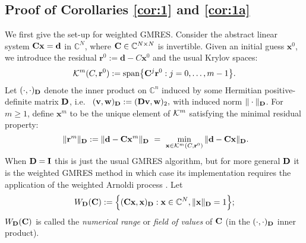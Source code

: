 \documentclass[10pt]{article}%
\newtheorem{remark}[theorem]{Remark}
\numberwithin{equation}{section}
\newcommand{\beq}{\begin{equation}}
\newcommand{\eeq}{\end{equation}}
\newcommand{\beqs}{\begin{equation*}}
\newcommand{\eeqs}{\end{equation*}}
\newcommand{\bre}{\begin{remark}}
\newcommand{\ere}{\end{remark}}
\newcommand{\cK}{{\cal K}}
\newcommand{\bx}{\mathbf{x}}
\newcommand{\br}{\mathbf{r}}
\newcommand{\bv}{\mathbf{v}}
\newcommand{\bw}{\mathbf{w}}
\newcommand{\bd}{\mathbf{d}}
\newcommand{\C}{\mathbb{C}}
\newcommand{\Com}{\mathbb{C}}
\newcommand{\HoDkk}{{H^1_{k}(\domain_R)}}
\newcommand*{\N}[1]{\left\|#1\right\|}
\newcommand{\domain}{\Omega}
\newcommand{\matrixI}{{\bf I}}
\newcommand{\matrixC}{{\bf C}}
\newcommand{\matrixD}{{\bf D}}
\newcommand{\matrixS}{{\bf S}}
\newcommand{\matrixM}{{\bf M}}
\begin{document}
%

\subsection{Proof of Corollaries \ref{cor:1} and \ref{cor:1a}}

We first give the set-up for weighted GMRES.
Consider the abstract  linear system 
$\matrixC \bx = \bd$
in $\mathbb{C}^N$, where $\matrixC \in \Com^{N\times N}$ is invertible.   
Given an initial guess $\bx^0$, we introduce the residual $\br^0 := \bd- C \bx^0$ and 
the usual Krylov spaces:  
\beqs  
\cK^m(C, \br^0) := \mathrm{span}\big\{\matrixC^j \br^0 : j = 0, \ldots, m-1\big\}.
\eeqs
Let $(\cdot , \cdot )_{\matrixD}$ denote the inner product on $\C^n$ 
induced by some Hermitian positive-definite matrix $\matrixD$, i.e.~
$(\bv,\bw)_{\matrixD} := (\matrixD \bv, \bw)_2,$
with induced norm $\Vert \cdot \Vert_\matrixD$. For $m \geq 1$, define   $\bx^m$  to be  the unique element of $\cK^m$ satisfying  the  
 minimal residual  property: 
$$ \ \Vert \br^m \Vert_\matrixD := \Vert \bd - \matrixC \bx^m \Vert_\matrixD \ = \ \min_{\bx \in \cK^m(C, \br^0)} \Vert {\bd} - {\matrixC} {\bx} \Vert_\matrixD. $$
When $\matrixD = \matrixI$ this is just the usual GMRES algorithm, but for  more general  $\matrixD$ it 
is the weighted GMRES method \cite{Es:98} in which case  
its implementation requires the application of the weighted Arnoldi process \cite{GuPe:14}.
Let 
\beq\label{eq:fov}
W_\matrixD(\matrixC):= \Big\{ (\matrixC \bx, \bx)_{\matrixD} : \bx \in \Com^N, \|\bx\|_\matrixD=1\Big\};
\eeq
$W_\matrixD(\matrixC)$ is called the \emph{numerical range} or \emph{field of values} of $\matrixC$ (in the $(\cdot,\cdot)_\matrixD$ inner product).
\end{document}
